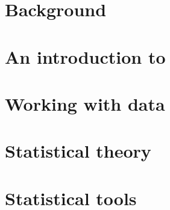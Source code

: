 





\pagestyle{plain}

\maketitle %





\part{Background}




\part{An introduction to \R}




\part{Working with data}






\part{Statistical theory}






\part{Statistical tools}

